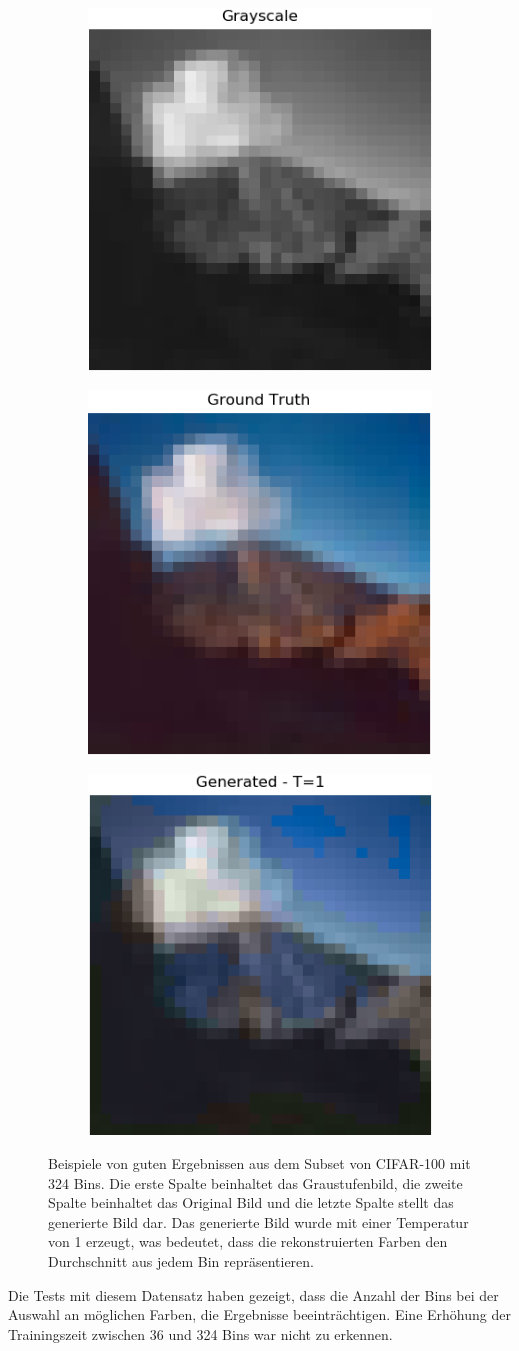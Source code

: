 \begin{figure}[H]
  \begin{subfigure}
    \centering
    \includegraphics[width=.24\textwidth]{resources/experiments/cifar/600_grayscale.png}
  \end{subfigure}
  \begin{subfigure}
    \centering
    \includegraphics[width=.24\textwidth]{resources/experiments/cifar/600_original.png}
  \end{subfigure}
  \begin{subfigure}
    \centering
    \includegraphics[width=.24\textwidth]{resources/experiments/cifar/600_t1.png}
  \end{subfigure}
  \caption{Beispiele von guten Ergebnissen aus dem Subset von CIFAR-100 mit 324 Bins. Die erste Spalte beinhaltet das Graustufenbild, die zweite Spalte
  beinhaltet das Original Bild und die letzte Spalte stellt das generierte Bild dar. Das generierte Bild wurde mit einer Temperatur von 1
  erzeugt, was bedeutet, dass die rekonstruierten Farben den Durchschnitt aus jedem Bin repräsentieren.}
  \label{image:gute-ergebnisse-cifar}
\end{figure}

Die Tests mit diesem Datensatz haben gezeigt, dass die Anzahl der Bins bei der Auswahl an möglichen Farben, die Ergebnisse beeinträchtigen.
Eine Erhöhung der Trainingszeit zwischen 36 und 324 Bins war nicht zu erkennen.

